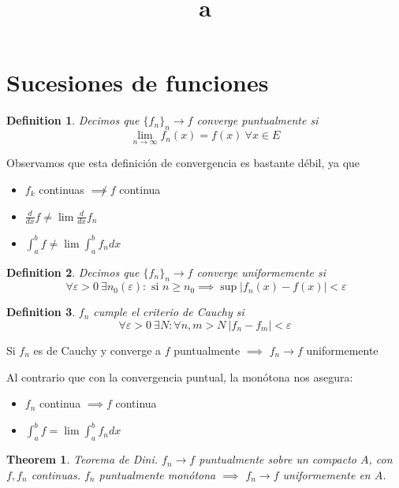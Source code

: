 \documentclass{myclass}
\title{a}
\newtheorem*{definition}{Definition}
\newtheorem*{theorem}{Theorem}
\newcommand{\fn}{\{f_n\}_n}
\begin{document}
\maketitle
\tableofcontents
\newpage

\section{Sucesiones de funciones}
\begin{definition}
  Decimos que $\fn \to f$ converge puntualmente si
  \[
	\lim_{n \to \infty} f_n(x) = f(x) \ \forall x \in E 
  \]
\end{definition}
Observamos que esta definición de convergencia es bastante débil, ya que
\begin{itemize}[topsep=0pt, itemsep=0pt]
  \item $f_k$ continuas  $\not\implies f$ continua \\
  \item $\displaystyle\frac{d}{dx} f \neq  \lim \frac{d}{dx} f_n$ 
  \item $\displaystyle\int_a^b f \neq  \lim \int_a^b f_n dx$
\end{itemize}

\begin{definition}
  Decimos que $\fn \to f$ converge uniformemente si
\[
\ \forall \varepsilon > 0 \ \exists n_0(\varepsilon) : \text{ si } n\ge n_0 \implies \sup  | f_n(x)-f(x)|<\varepsilon
\] 
\end{definition}

\begin{definition}
$f_n$ cumple el criterio de Cauchy si
 \[
\forall \varepsilon >0 \ \exists N : \forall n, m>N \ |f_n-f_m | <\varepsilon 
\] 
\end{definition}

Si $f_n$ es de Cauchy y converge a  $f$ puntualmente  $\implies$ $f_n \to f$ uniformemente

Al contrario que con la convergencia puntual, la monótona nos asegura:
\begin{itemize}[topsep=0pt, itemsep=0pt]
  \item $f_n$ continua  $\implies f$ continua
  \item $\displaystyle\int_a^b f =  \lim \int_a^b f_n dx$
\end{itemize}


\begin{theorem}
Teorema de Dini. $f_n \to f$ puntualmente sobre un compacto  $A$, con $f, f_n$ continuas. $f_n$ puntualmente monótona  $\implies$ $f_n\to f $ uniformemente en $A$.
\end{theorem}
\end{document}

